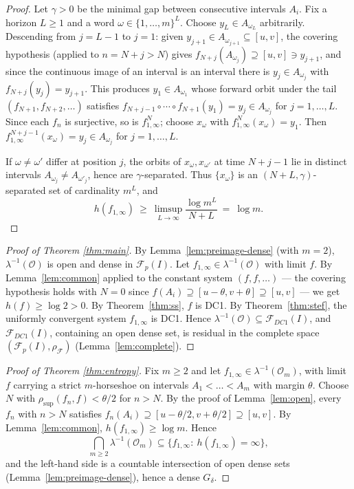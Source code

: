 \documentclass[11pt]{article}
\newcommand{\I}{I}
\newcommand{\Fp}{\mathcal F_p(\I)}
\newcommand{\FDC}{\mathcal F_{DC1}(\I)}
\newcommand{\rsup}{\rho_{\sup}}
\newcommand{\rF}{\rho_{\mathcal F}}
\newcommand{\lm}{\lambda}
\begin{document}
\begin{proof}
Let $\gamma>0$ be the minimal gap between consecutive intervals $A_i$.  Fix a
horizon $L\ge1$ and a word $\omega\in\{1,\dots,m\}^L$.  Choose
$y_L\in A_{\omega_L}$ arbitrarily.  Descending from $j=L-1$ to $j=1$: given
$y_{j+1}\in A_{\omega_{j+1}}\subseteq[u,v]$, the covering hypothesis (applied to
$n=N+j>N$) gives $f_{N+j}(A_{\omega_j})\supseteq[u,v]\ni y_{j+1}$, and since the
continuous image of an interval is an interval there is
$y_j\in A_{\omega_j}$ with $f_{N+j}(y_j)=y_{j+1}$.  This produces
$y_1\in A_{\omega_1}$ whose forward orbit under the tail
$(f_{N+1},f_{N+2},\dots)$ satisfies
$f_{N+j-1}\circ\cdots\circ f_{N+1}(y_1)=y_j\in A_{\omega_j}$ for $j=1,\dots,L$.
Since each $f_n$ is surjective, so is $f^N_{1,\infty}$; choose
$x_\omega$ with $f^N_{1,\infty}(x_\omega)=y_1$.  Then
$f^{N+j-1}_{1,\infty}(x_\omega)=y_j\in A_{\omega_j}$ for $j=1,\dots,L$.

If $\omega\ne\omega'$ differ at position $j$, the orbits of $x_\omega,x_{\omega'}$
at time $N+j-1$ lie in distinct intervals $A_{\omega_j}\ne A_{\omega'_j}$, hence
are $\gamma$-separated.  Thus $\{x_\omega\}$ is an
$(N+L,\gamma)$-separated set of cardinality $m^L$, and
\[
h(f_{1,\infty})\ \ge\ \limsup_{L\to\infty}\frac{\log m^L}{N+L}\ =\ \log m .
\]
\end{proof}

\begin{proof}[Proof of Theorem \ref{thm:main}]
By Lemma~\ref{lem:preimage-dense} (with $m=2$), $\lm^{-1}(\mathcal O)$ is open and
dense in $\Fp$.  Let $f_{1,\infty}\in\lm^{-1}(\mathcal O)$ with limit $f$.  By
Lemma~\ref{lem:common} applied to the constant system $(f,f,\dots)$ --- the
covering hypothesis holds with $N=0$ since $f(A_i)\supseteq[u-\theta,v+\theta]
\supseteq[u,v]$ --- we get $h(f)\ge\log2>0$.  By Theorem~\ref{thm:ss}, $f$ is DC1.
By Theorem~\ref{thm:stef}, the uniformly convergent system $f_{1,\infty}$ is DC1.
Hence $\lm^{-1}(\mathcal O)\subseteq\FDC$, and $\FDC$, containing an open dense
set, is residual in the complete space $(\Fp,\rF)$ (Lemma~\ref{lem:complete}).
\end{proof}

\begin{proof}[Proof of Theorem \ref{thm:entropy}]
Fix $m\ge2$ and let $f_{1,\infty}\in\lm^{-1}(\mathcal O_m)$, with limit $f$
carrying a strict $m$-horseshoe on intervals $A_1<\dots<A_m$ with margin $\theta$.
Choose $N$ with $\rsup(f_n,f)<\theta/2$ for $n>N$.  By the proof of
Lemma~\ref{lem:open}, every $f_n$ with $n>N$ satisfies
$f_n(A_i)\supseteq[u-\theta/2,v+\theta/2]\supseteq[u,v]$.  By
Lemma~\ref{lem:common}, $h(f_{1,\infty})\ge\log m$.  Hence
\[
\bigcap_{m\ge2}\lm^{-1}(\mathcal O_m)\subseteq
\bigl\{f_{1,\infty}:\ h(f_{1,\infty})=\infty\bigr\},
\]
and the left-hand side is a countable intersection of open dense sets
(Lemma~\ref{lem:preimage-dense}), hence a dense $G_\delta$.
\end{proof}
\end{document}
